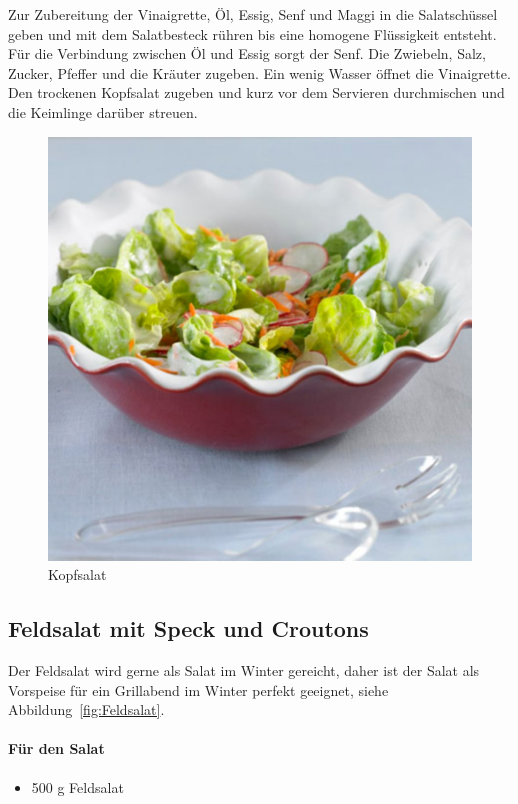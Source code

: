 Zur Zubereitung der Vinaigrette, Öl, Essig, Senf und Maggi in die Salatschüssel geben und mit dem Salatbesteck rühren bis eine 
homogene Flüssigkeit entsteht. 
Für die 
Verbindung zwischen Öl und Essig sorgt der Senf. Die Zwiebeln, Salz, Zucker, Pfeffer und die Kräuter zugeben. Ein wenig Wasser öffnet 
die Vinaigrette. Den 
trockenen 
Kopfsalat zugeben und kurz vor dem Servieren durchmischen und die Keimlinge darüber streuen.
\newpage
\begin{figure}[h]
	\centering
	\includegraphics[scale=.4]{pics/Kopfsalat}
	\caption{Kopfsalat}
	\label{fig:Kopfsalat}
\end{figure}

\subsection{Feldsalat mit Speck und Croutons}
Der Feldsalat wird gerne als Salat im Winter gereicht, daher ist der Salat als Vorspeise für ein Grillabend im Winter perfekt geeignet, siehe 
Abbildung~\vref{fig:Feldsalat}.

\paragraph{Für den Salat}

\begin{itemize}[noitemsep]
	\item 500 g Feldsalat
\end{itemize}	


